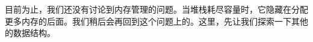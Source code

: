 目前为止，我们还没有讨论到内存管理的问题。当堆栈耗尽容量时，它隐藏在分配更多内存的后面。我们稍后会再回到这个问题上的。这里，先让我们探索一下其他的数据结构。


































